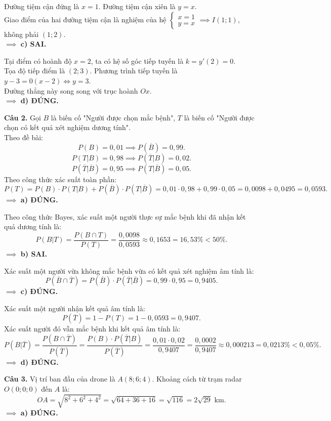 \documentclass[12pt,a4paper]{article}
\begin{document}
Đường tiệm cận đứng là $x = 1$. Đường tiệm cận xiên là $y = x$.\\
Giao điểm của hai đường tiệm cận là nghiệm của hệ $\begin{cases} x = 1 \\ y = x \end{cases} \implies I(1; 1)$, không phải $(1; 2)$.\\
$\implies$ \textbf{c) SAI.}

Tại điểm có hoành độ $x = 2$, ta có hệ số góc tiếp tuyến là $k = y'(2) = 0$.\\
Tọa độ tiếp điểm là $(2; 3)$. Phương trình tiếp tuyến là $y - 3 = 0(x - 2) \iff y = 3$.\\
Đường thẳng này song song với trục hoành $Ox$.\\
$\implies$ \textbf{d) ĐÚNG.}

\vspace{0.3cm}
\noindent\textbf{Câu 2.}
Gọi $B$ là biến cố "Người được chọn mắc bệnh", $T$ là biến cố "Người được chọn có kết quả xét nghiệm dương tính".\\
Theo đề bài:
\[
P(B) = 0{,}01 \implies P(\overline{B}) = 0{,}99.
\]
\[
P(T|B) = 0{,}98 \implies P(\overline{T}|B) = 0{,}02.
\]
\[
P(\overline{T}|\overline{B}) = 0{,}95 \implies P(T|\overline{B}) = 0{,}05.
\]
Theo công thức xác suất toàn phần:
\[
P(T) = P(B) \cdot P(T|B) + P(\overline{B}) \cdot P(T|\overline{B}) = 0{,}01 \cdot 0{,}98 + 0{,}99 \cdot 0{,}05 = 0{,}0098 + 0{,}0495 = 0{,}0593.
\]
$\implies$ \textbf{a) ĐÚNG.}

Theo công thức Bayes, xác suất một người thực sự mắc bệnh khi đã nhận kết quả dương tính là:
\[
P(B|T) = \dfrac{P(B \cap T)}{P(T)} = \dfrac{0{,}0098}{0{,}0593} \approx 0{,}1653 = 16{,}53\% < 50\%.
\]
$\implies$ \textbf{b) SAI.}

Xác suất một người vừa không mắc bệnh vừa có kết quả xét nghiệm âm tính là:
\[
P(\overline{B} \cap \overline{T}) = P(\overline{B}) \cdot P(\overline{T}|\overline{B}) = 0{,}99 \cdot 0{,}95 = 0{,}9405.
\]
$\implies$ \textbf{c) ĐÚNG.}

Xác suất một người nhận kết quả âm tính là:
\[
P(\overline{T}) = 1 - P(T) = 1 - 0{,}0593 = 0{,}9407.
\]
Xác suất người đó vẫn mắc bệnh khi kết quả âm tính là:
\[
P(B|\overline{T}) = \dfrac{P(B \cap \overline{T})}{P(\overline{T})} = \dfrac{P(B) \cdot P(\overline{T}|B)}{P(\overline{T})} = \dfrac{0{,}01 \cdot 0{,}02}{0{,}9407} = \dfrac{0{,}0002}{0{,}9407} \approx 0{,}000213 = 0{,}0213\% < 0{,}05\%.
\]
$\implies$ \textbf{d) ĐÚNG.}

\vspace{0.3cm}
\noindent\textbf{Câu 3.}
Vị trí ban đầu của drone là $A(8; 6; 4)$. Khoảng cách từ trạm radar $O(0; 0; 0)$ đến $A$ là:
\[
OA = \sqrt{8^2 + 6^2 + 4^2} = \sqrt{64 + 36 + 16} = \sqrt{116} = 2\sqrt{29}\text{ km}.
\]
$\implies$ \textbf{a) ĐÚNG.}
\end{document}
